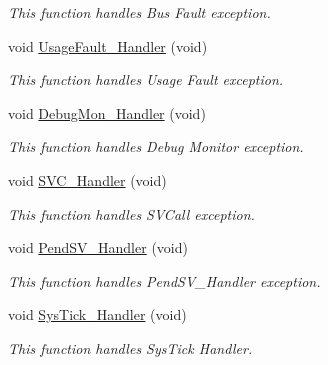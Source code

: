 \begin{DoxyCompactItemize}
\begin{DoxyCompactList}\small\item\em This function handles Bus Fault exception. \end{DoxyCompactList}\item 
void \hyperlink{group___t_i_m___p_w_m___output_ga1d98923de2ed6b7309b66f9ba2971647}{Usage\-Fault\-\_\-\-Handler} (void)
\begin{DoxyCompactList}\small\item\em This function handles Usage Fault exception. \end{DoxyCompactList}\item 
void \hyperlink{group___t_i_m___p_w_m___output_gadbdfb05858cc36fc520974df37ec3cb0}{Debug\-Mon\-\_\-\-Handler} (void)
\begin{DoxyCompactList}\small\item\em This function handles Debug Monitor exception. \end{DoxyCompactList}\item 
void \hyperlink{group___t_i_m___p_w_m___output_ga3e5ddb3df0d62f2dc357e64a3f04a6ce}{S\-V\-C\-\_\-\-Handler} (void)
\begin{DoxyCompactList}\small\item\em This function handles S\-V\-Call exception. \end{DoxyCompactList}\item 
void \hyperlink{group___t_i_m___p_w_m___output_ga6303e1f258cbdc1f970ce579cc015623}{Pend\-S\-V\-\_\-\-Handler} (void)
\begin{DoxyCompactList}\small\item\em This function handles Pend\-S\-V\-\_\-\-Handler exception. \end{DoxyCompactList}\item 
void \hyperlink{group___t_i_m___p_w_m___output_gab5e09814056d617c521549e542639b7e}{Sys\-Tick\-\_\-\-Handler} (void)
\begin{DoxyCompactList}\small\item\em This function handles Sys\-Tick Handler. \end{DoxyCompactList}\end{DoxyCompactItemize}

